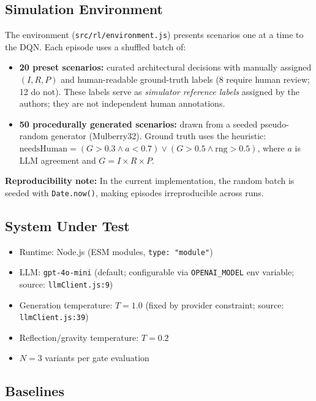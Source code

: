 \documentclass[conference]{IEEEtran}
\begin{document}
\subsection{Simulation Environment}

The environment (\texttt{src/rl/environment.js}) presents scenarios one at a
time to the DQN.
Each episode uses a shuffled batch of:
\begin{itemize}
  \item \textbf{20 preset scenarios:} curated architectural decisions with
        manually assigned $(I, R, P)$ and human-readable ground-truth labels
        (8 require human review; 12 do not).
        These labels serve as \emph{simulator reference labels} assigned by
        the authors; they are not independent human annotations.
  \item \textbf{50 procedurally generated scenarios:} drawn from a seeded
        pseudo-random generator (Mulberry32).
        Ground truth uses the heuristic:
        $\mathrm{needsHuman} = (G{>}0.3 \land a{<}0.7) \lor
        (G{>}0.5 \land \mathrm{rng}{>}0.5)$,
        where $a$ is LLM agreement and $G = I{\times}R{\times}P$.
\end{itemize}

\noindent\textbf{Reproducibility note:}
In the current implementation, the random batch is seeded with
\texttt{Date.now()}, making episodes irreproducible across runs.

\subsection{System Under Test}

\begin{itemize}
  \item Runtime: Node.js (ESM modules, \texttt{type: "module"})
  \item LLM: \texttt{gpt-4o-mini} (default; configurable via
        \texttt{OPENAI\_MODEL} env variable; source: \texttt{llmClient.js:9})
  \item Generation temperature: $T{=}1.0$ (fixed by provider constraint;
        source: \texttt{llmClient.js:39})
  \item Reflection/gravity temperature: $T{=}0.2$
  \item $N{=}3$ variants per gate evaluation
\end{itemize}

\subsection{Baselines}
\end{document}
